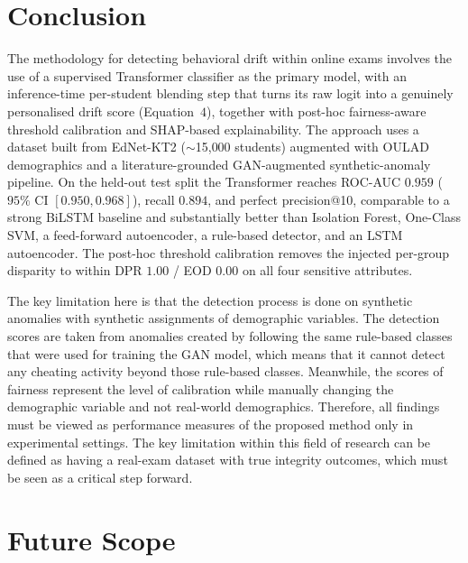 \documentclass[sigconf]{acmart}
\begin{document}
\section{Conclusion}
\label{sec:conclusion}

The methodology for detecting behavioral drift within online exams involves the use of a supervised Transformer classifier as the primary model, with an inference-time per-student blending step that turns its raw logit into a genuinely personalised drift score (Equation~$4$), together with post-hoc fairness-aware threshold calibration and SHAP-based explainability. The approach uses a dataset built from EdNet-KT2 ($\sim$15{,}000 students) augmented with OULAD demographics and a literature-grounded GAN-augmented synthetic-anomaly pipeline. On the held-out test split the Transformer reaches ROC-AUC $0.959$ ($95\%$ CI $[0.950, 0.968]$), recall $0.894$, and perfect precision@10, comparable to a strong BiLSTM baseline and substantially better than Isolation Forest, One-Class SVM, a feed-forward autoencoder, a rule-based detector, and an LSTM autoencoder. The post-hoc threshold calibration removes the injected per-group disparity to within DPR $1.00$ / EOD $0.00$ on all four sensitive attributes.

The key limitation here is that the detection process is done on synthetic anomalies with synthetic assignments of demographic variables. The detection scores are taken from anomalies created by following the same rule-based classes that were used for training the GAN model, which means that it cannot detect any cheating activity beyond those rule-based classes. Meanwhile, the scores of fairness represent the level of calibration while manually changing the demographic variable and not real-world demographics. Therefore, all findings must be viewed as performance measures of the proposed method only in experimental settings. The key limitation within this field of research can be defined as having a real-exam dataset with true integrity outcomes, which must be seen as a critical step forward.

\section{Future Scope}
\label{sec:future}
\end{document}
